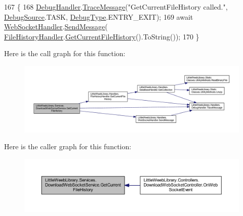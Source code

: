 \begin{DoxyCode}
167         \{
168             \mbox{\hyperlink{class_little_weeb_library_1_1_handlers_1_1_debug_handler}{DebugHandler}}.\mbox{\hyperlink{class_little_weeb_library_1_1_handlers_1_1_debug_handler_afccb37dfd6b2114af72000c2f4fe4607}{TraceMessage}}(\textcolor{stringliteral}{"GetCurrentFileHistory called."}, 
      \mbox{\hyperlink{namespace_little_weeb_library_1_1_handlers_a2a6ca0775121c9c503d58aa254d292be}{DebugSource}}.TASK, \mbox{\hyperlink{namespace_little_weeb_library_1_1_handlers_ab66019ed40462876ec4e61bb3ccb0a62}{DebugType}}.ENTRY\_EXIT);
169             await \mbox{\hyperlink{class_little_weeb_library_1_1_handlers_1_1_web_socket_handler}{WebSocketHandler}}.\mbox{\hyperlink{class_little_weeb_library_1_1_handlers_1_1_web_socket_handler_a1de289d54d665a32c93478c68d3e6ad0}{SendMessage}}(
      \mbox{\hyperlink{class_little_weeb_library_1_1_handlers_1_1_file_history_handler}{FileHistoryHandler}}.\mbox{\hyperlink{class_little_weeb_library_1_1_handlers_1_1_file_history_handler_a7e5a72e2cfdc3dfe97066cc7504b4445}{GetCurrentFileHistory}}().ToString());
170         \}
\end{DoxyCode}
Here is the call graph for this function\+:\nopagebreak
\begin{figure}[H]
\begin{center}
\leavevmode
\includegraphics[width=350pt]{class_little_weeb_library_1_1_services_1_1_download_web_socket_service_adb3b1a3aadf9ad491388890e432f6c91_cgraph}
\end{center}
\end{figure}
Here is the caller graph for this function\+:\nopagebreak
\begin{figure}[H]
\begin{center}
\leavevmode
\includegraphics[width=350pt]{class_little_weeb_library_1_1_services_1_1_download_web_socket_service_adb3b1a3aadf9ad491388890e432f6c91_icgraph}
\end{center}
\end{figure}
